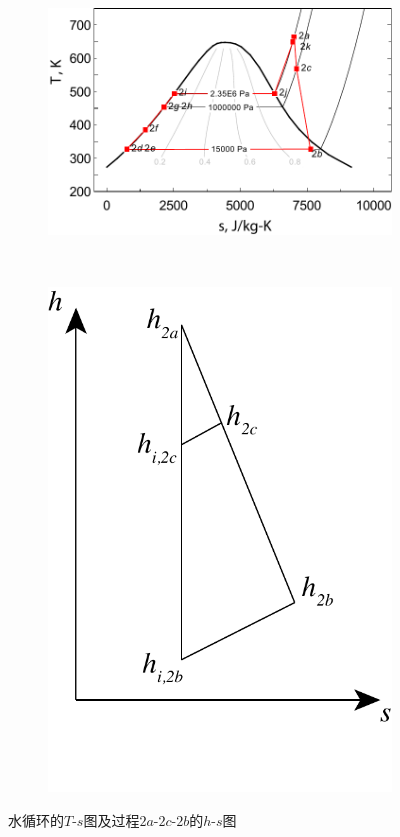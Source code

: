 \noindent \begin{figure}[htbp]
\centering
	\begin{subfigure}[b]{0.6\columnwidth}
	\includegraphics[width = \columnwidth]{fig/T-s_Water.pdf}
	\caption{}\label{fig:Ts_Water1}
	\end{subfigure}
	~
\begin{subfigure}[b]{0.28\columnwidth}
	\includegraphics[width = \columnwidth]{fig/SteamTurbine_hs.pdf}
	\caption{}\label{fig:SteamTurbine_hs}
	\end{subfigure}
	
	\caption{水循环的$T$-$s$图及过程$2a$-$2c$-$2b$的$h$-$s$图}\label{fig:SteamTurbine_hs_p}
\end{figure}

